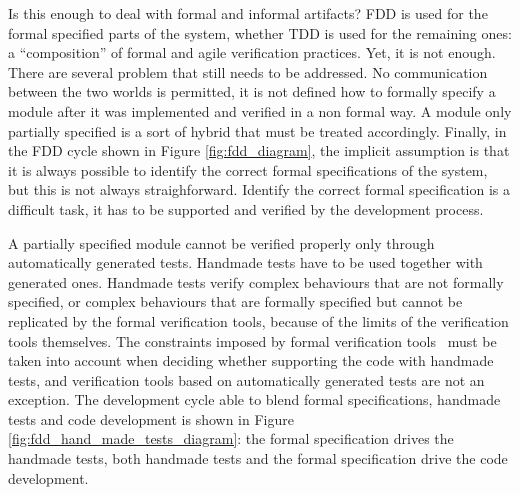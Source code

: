 \documentclass[english]{lni}
\begin{document}
Is this enough to deal with formal and informal artifacts?
FDD is used for the formal specified parts of the system, whether TDD is used for the remaining ones: a ``composition'' of formal and agile verification practices.
Yet, it is not enough.
There are several problem that still needs to be addressed.
No communication between the two worlds is permitted, it is not defined how to formally specify a module after it was implemented and verified in a non formal way.
A module only partially specified is a sort of hybrid that must be treated accordingly.
Finally, in the FDD cycle shown in Figure \ref{fig:fdd_diagram}, the implicit assumption is that it is always possible to identify the correct formal specifications of the system, but this is not always straighforward.
Identify the correct formal specification is a difficult task, it has to be supported and verified by the development process.

A partially specified module cannot be verified properly only through automatically generated tests.
Handmade tests have to be used together with generated ones.
Handmade tests verify complex behaviours that are not formally specified, or complex behaviours that are formally specified but cannot be replicated by the formal verification tools, because of the limits of the verification tools themselves. 
The constraints imposed by formal verification tools~\cite{Glass2002} must be taken into account when deciding whether supporting the code with handmade tests, and verification tools based on automatically generated tests are not an exception.
The development cycle able to blend formal specifications, handmade tests and code development is shown in Figure \ref{fig:fdd_hand_made_tests_diagram}: the formal specification drives the handmade tests, both handmade tests and the formal specification drive the code development.
\end{document}
